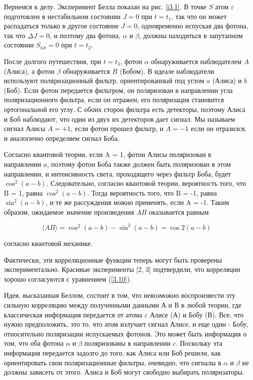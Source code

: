 \documentclass[main.tex]{subfiles}
\begin{document}
Вернемся к делу. Эксперимент Белла показан на рис. \ref{i3.1}. В точке $S$ атом $\varepsilon$ подготовлен в нестабильном состоянии $J = 0$ при $t = t_1$, так что он может распадаться только в другое состояние $J = 0$, одновременно испуская два фотона, так что $\Delta J = 0$, и поэтому два фотона, $\alpha$ и $\beta$, должны находиться в запутанном состоянии $S_{tot} = 0$ при $t = t_2$.

После долгого путешествия, при $t = t_3$, фотон $\alpha$ обнаруживается наблюдателем $A$ (Алиса), а фотон $\beta$ обнаруживается $B$ (Бобом). В идеале наблюдатели используют поляризационный фильтр, ориентированный под углом $a$ (Алиса) и $b$ (Боб). Если фотон передается фильтром, он поляризован в направлении угла поляризационного фильтра, если он отражен, его поляризация становится ортогональной его углу. С обоих сторон фильтра есть детекторы, поэтому Алиса и Боб наблюдают, что один из двух их детекторов дает сигнал. Мы называем сигнал Алисы $A = + 1$, если фотон прошел фильтр, и $A = -1$ если он отразился, и аналогично определяем сигнал Боба.

Согласно квантовой теории, если A = 1, фотон Алисы поляризован в направлении $a$, поэтому фотон Боба также должен быть поляризован в этом направлении, и интенсивность света, проходящего через фильтр Боба, будет $\cos^2 (a - b)$. Следовательно, согласно квантовой теории, вероятность того, что B = 1, равна $\cos^2 (a - b)$. Тогда вероятность того, что B = -1, равна $\sin^2 (a - b)$, и те же рассуждения можно применять, если A = -1. Таким образом, ожидаемое значение произведения $AB$ оказывается равным

\begin{equation}\label{3.10}
	\langle A B\rangle=\cos ^{2}(a-b)-\sin ^{2}(a-b)=\cos 2(a-b)
\end{equation}
            
согласно квантовой механике.
 
Фактически, эти корреляционные функции теперь могут быть проверены экспериментально. Красивые эксперименты [2, 3] подтвердили, что корреляции хорошо согласуются с уравнением (\ref{3.10}).

Идея, высказанная Беллом, состоит в том, что невозможно воспроизвести эту сильную корреляцию между полученными данными А и В в любой теории, где классическая информация передается от атома $\varepsilon$ Алисе (А) и Бобу (В). Все, что нужно предположить, это то, что атом излучает сигнал Алисе, и еще один - Бобу, относительно поляризации испускаемых фотонов. Это может быть информация о том, что оба фотона $\alpha$ и $\beta$ поляризованы в направлении $c$. Поскольку эта информация передается задолго до того, как Алиса или Боб решили, как ориентировать свои поляризационные фильтры, очевидно, что сигналы в $\alpha$ и $\beta$ не должны зависеть от этого. Алиса и Боб могут свободно выбирать поляризаторы.
\end{document}
